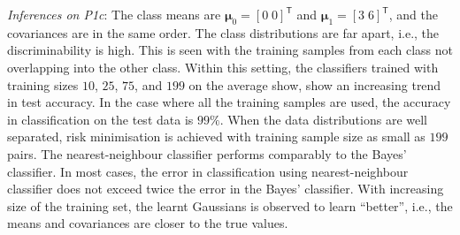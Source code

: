 \documentclass[11pt, a4 paper]{article}
\newcommand{\TT}{\mathsf{T}}
\newcommand{\bmu}{\boldsymbol{\mu}}
\begin{document}
{\it Inferences on P1c}: The class means are $\bmu_{0} = [0 \; 0]^{\TT}$ and $\bmu_{1} = [3 \; 6]^{\TT}$, and the covariances are in the same order. The class distributions are far apart, i.e., the discriminability is high. This is seen with the training samples from each class not overlapping into the other class. Within this setting, the classifiers trained with training sizes $10$, $25$, $75$, and $199$ on the average show, show an increasing trend in test accuracy. In the case where all the training samples are used, the accuracy in classification on the test data is $99\%$. When the data distributions are well separated, risk minimisation is achieved with training sample size as small as $199$ pairs. The nearest-neighbour classifier performs comparably to the Bayes' classifier. In most cases, the error in classification using nearest-neighbour classifier does not exceed twice the error in the Bayes' classifier. With increasing size of the training set, the learnt Gaussians is observed to learn ``better'', i.e., the means and covariances are closer to the true values.

\end{document}
